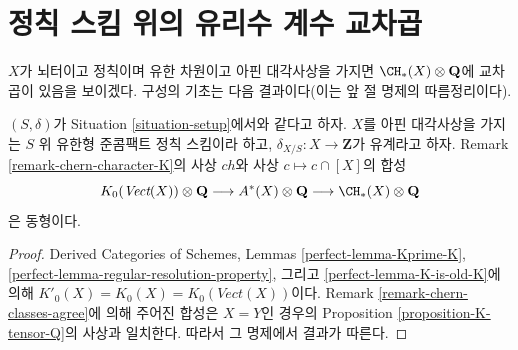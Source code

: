 \section{정칙 스킴 위의 유리수 계수 교차곱}
\label{section-intersection-regular}

\noindent
$X$가 뇌터이고 정칙이며 유한 차원이고 아핀 대각사상을 가지면
$\CH_*(X) \otimes \mathbf{Q}$에 교차곱이 있음을 보이겠다. 구성의
기초는 다음 결과이다(이는 앞 절 명제의 따름정리이다).

\begin{lemma}
\label{lemma-K-tensor-Q}
$(S, \delta)$가 Situation \ref{situation-setup}에서와 같다고 하자.
$X$를 아핀 대각사상을 가지는 $S$ 위 유한형 준콤팩트 정칙 스킴이라
하고, $\delta_{X/S} : X \to \mathbf{Z}$가 유계라고 하자. Remark
\ref{remark-chern-character-K}의 사상 $ch$와 사상
$c \mapsto c \cap [X]$의 합성
$$
K_0(\textit{Vect}(X)) \otimes \mathbf{Q}
\longrightarrow
A^*(X) \otimes \mathbf{Q}
\longrightarrow
\CH_*(X) \otimes \mathbf{Q}
$$
은 동형이다.
\end{lemma}

\begin{proof}
Derived Categories of Schemes, Lemmas \ref{perfect-lemma-Kprime-K},
\ref{perfect-lemma-regular-resolution-property}, 그리고
\ref{perfect-lemma-K-is-old-K}에 의해
$K'_0(X) = K_0(X) = K_0(\textit{Vect}(X))$이다. Remark
\ref{remark-chern-classes-agree}에 의해 주어진 합성은 $X = Y$인 경우의
Proposition \ref{proposition-K-tensor-Q}의 사상과 일치한다. 따라서 그
명제에서 결과가 따른다.
\end{proof}

